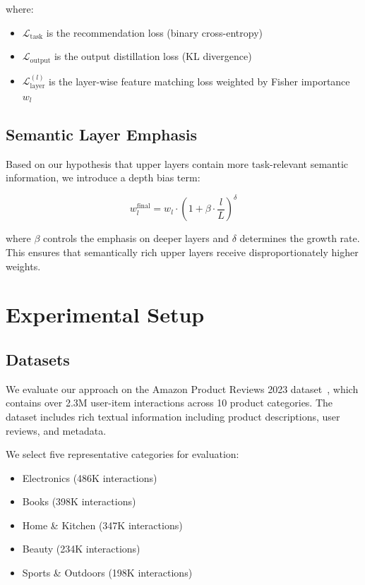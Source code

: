 \documentclass[10pt,conference]{IEEEtran}
\newcommand{\loss}{\mathcal{L}}
\begin{document}
where:
\begin{itemize}
    \item $\loss_{\text{task}}$ is the recommendation loss (binary cross-entropy)
    \item $\loss_{\text{output}}$ is the output distillation loss (KL divergence)
    \item $\loss_{\text{layer}}^{(l)}$ is the layer-wise feature matching loss weighted by Fisher importance $w_l$
\end{itemize}

\subsection{Semantic Layer Emphasis}

Based on our hypothesis that upper layers contain more task-relevant semantic information, we introduce a depth bias term:

\begin{equation}
w_l^{\text{final}} = w_l \cdot \left(1 + \beta \cdot \frac{l}{L}\right)^{\delta}
\end{equation}

where $\beta$ controls the emphasis on deeper layers and $\delta$ determines the growth rate. This ensures that semantically rich upper layers receive disproportionately higher weights.

\section{Experimental Setup}

\subsection{Datasets}

We evaluate our approach on the Amazon Product Reviews 2023 dataset~\cite{hou2024bridging}, which contains over 2.3M user-item interactions across 10 product categories. The dataset includes rich textual information including product descriptions, user reviews, and metadata.

We select five representative categories for evaluation:
\begin{itemize}
    \item Electronics (486K interactions)
    \item Books (398K interactions)
    \item Home \& Kitchen (347K interactions)
    \item Beauty (234K interactions)
    \item Sports \& Outdoors (198K interactions)
\end{itemize}
\end{document}
